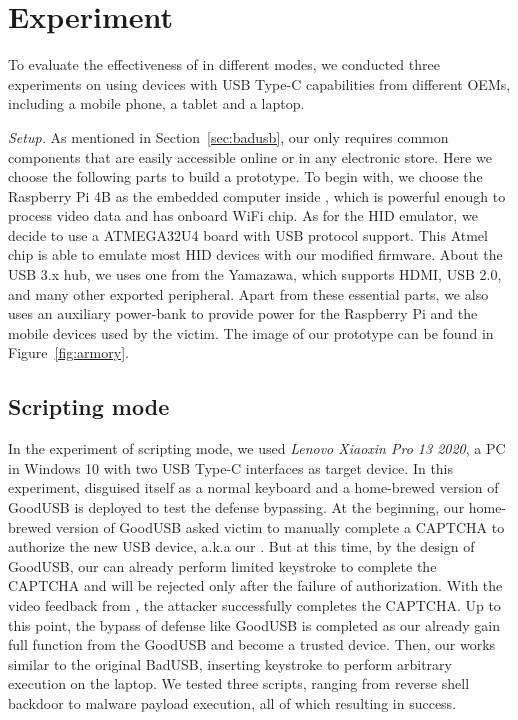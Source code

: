 \section{Experiment}
\label{sec:experiment}

To evaluate the effectiveness of \tool in different modes, we conducted three experiments on \tool using devices with USB Type-C capabilities from different OEMs, including a mobile phone, a tablet and a laptop.

\textit{Setup.} As mentioned in Section~\ref{sec:badusb}, our \tool only requires common components that are easily accessible online or in any electronic store. Here we choose the following parts to build a prototype. To begin with, we choose the Raspberry Pi 4B as the embedded computer inside \tool, which is powerful enough to process video data and has onboard WiFi chip. As for the HID emulator, we decide to use a ATMEGA32U4 board with USB protocol support. This Atmel chip is able to emulate most HID devices with our modified firmware. About the USB 3.x hub, we uses one from the Yamazawa, which supports HDMI, USB 2.0, and many other exported peripheral. Apart from these essential parts, we also uses an auxiliary power-bank to provide power for the Raspberry Pi and the mobile devices used by the victim. The image of our prototype \tool can be found in Figure~\ref{fig:armory}.

\subsection{Scripting mode}

In the experiment of scripting mode, we used \textit{Lenovo Xiaoxin Pro 13 2020}, a PC in Windows 10 with two USB Type-C interfaces as target device. 
In this experiment, \tool disguised itself as a normal keyboard and a home-brewed version of GoodUSB\cite{tian2015defending} is deployed to test the defense bypassing.
At the beginning, our home-brewed version of GoodUSB asked victim to manually complete a CAPTCHA to  authorize the new USB device, a.k.a our \tool. But at this time, by the design of GoodUSB, our \tool can already perform limited keystroke to complete the CAPTCHA and will be rejected only after the failure of authorization. With the video feedback from \tool, the attacker successfully completes the CAPTCHA.
Up to this point, the bypass of defense like GoodUSB is completed as our \tool already gain full function from the GoodUSB and become a trusted device. Then, our \tool works similar to the original BadUSB, inserting keystroke to perform arbitrary execution on the laptop. We tested three scripts, ranging from reverse shell backdoor to malware payload execution, all of which resulting in success.

